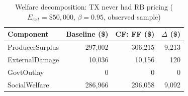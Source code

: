 \begin{table}[htbp]
\centering
\caption{Welfare decomposition: TX never had RB pricing
  ($E_{ext} = \$50{,}000$, $\beta=0.95$, observed sample)}
\label{tab:cf_welfare}
\begin{tabular}{lrrr}
\hline
Component & Baseline (\$) & CF: FF (\$) & $\Delta$ (\$) \\
\hline
ProducerSurplus & 297,002 & 306,215 & 9,213 \\
ExternalDamage & 10,036 & 10,156 & 120 \\
GovtOutlay & 0 & 0 & 0 \\
SocialWelfare & 286,966 & 296,058 & 9,092 \\
\hline
\end{tabular}
\end{table}
